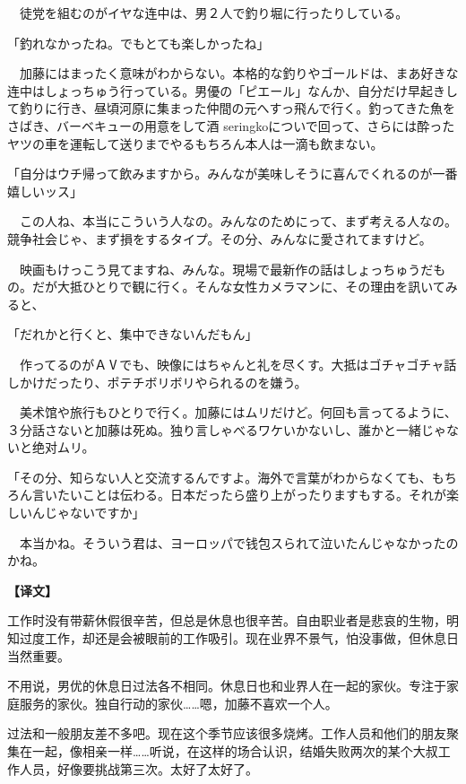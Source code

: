 \documentclass[12pt,UTF8]{ctexbook}
\begin{document}
{{　徒党を組むのがイヤな连中は、男２人で釣り堀に行ったりしている。

「釣れなかったね。でもとても楽しかったね」

　加藤にはまったく意味がわからない。本格的な釣りやゴールドは、まあ好きな连中はしょっちゅう行っている。男優の「ピエール」なんか、自分だけ早起きして釣りに行き、昼頃河原に集まった仲間の元へすっ飛んで行く。釣ってきた魚をさばき、バーベキューの用意をして酒 seringkoについで回って、さらには酔ったヤツの車を運転して送りまでやるもちろん本人は一滴も飲まない。

「自分はウチ帰って飲みますから。みんなが美味しそうに喜んでくれるのが一番嬉しいッス」

　この人ね、本当にこういう人なの。みんなのためにって、まず考える人なの。競争社会じゃ、まず損をするタイプ。その分、みんなに愛されてますけど。

　映画もけっこう見てますね、みんな。現場で最新作の話はしょっちゅうだもの。だが大抵ひとりで観に行く。そんな女性カメラマンに、その理由を訊いてみると、

「だれかと行くと、集中できないんだもん」

　作ってるのがＡⅤでも、映像にはちゃんと礼を尽くす。大抵はゴチャゴチャ話しかけだったり、ポテチボリボリやられるのを嫌う。

　美术馆や旅行もひとりで行く。加藤にはムリだけど。何回も言ってるように、３分話さないと加藤は死ぬ。独り言しゃべるワケいかないし、誰かと一緒じゃないと绝对ムリ。

「その分、知らない人と交流するんですよ。海外で言葉がわからなくても、もちろん言いたいことは伝わる。日本だったら盛り上がったりますもする。それが楽しいんじゃないですか」

　本当かね。そういう君は、ヨーロッパで钱包スられて泣いたんじゃなかったのかね。
}

\vspace{2ex}
\parbox{0.9\linewidth}{
\textbf{【译文】}\par

工作时没有带薪休假很辛苦，但总是休息也很辛苦。自由职业者是悲哀的生物，明知过度工作，却还是会被眼前的工作吸引。现在业界不景气，怕没事做，但休息日当然重要。

不用说，男优的休息日过法各不相同。休息日也和业界人在一起的家伙。专注于家庭服务的家伙。独自行动的家伙……嗯，加藤不喜欢一个人。

过法和一般朋友差不多吧。现在这个季节应该很多烧烤。工作人员和他们的朋友聚集在一起，像相亲一样……听说，在这样的场合认识，结婚失败两次的某个大叔工作人员，好像要挑战第三次。太好了太好了。

}}
\end{document}
